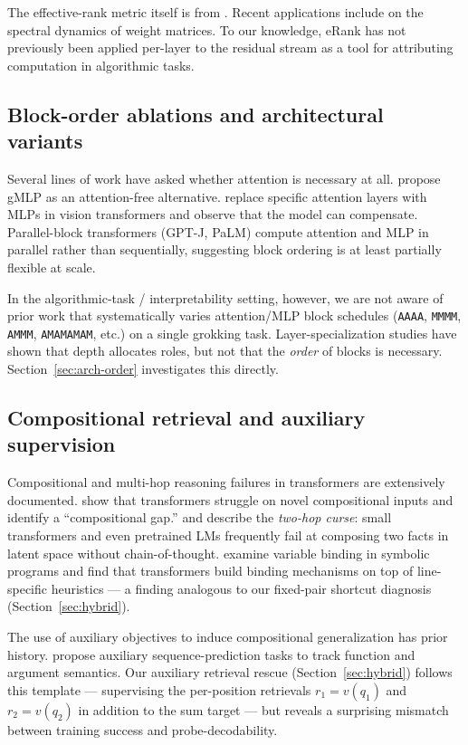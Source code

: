 \documentclass{article}
\begin{document}
The effective-rank metric itself is from \citet{roy2007effective}. Recent applications include \citet{yunis2024spectral} on the spectral dynamics of weight matrices. To our knowledge, eRank has not previously been applied per-layer to the residual stream as a tool for attributing computation in algorithmic tasks.

\subsection{Block-order ablations and architectural variants}

Several lines of work have asked whether attention is necessary at all. \citet{liu2021gmlp} propose gMLP as an attention-free alternative. \citet{lin2024mlp} replace specific attention layers with MLPs in vision transformers and observe that the model can compensate. Parallel-block transformers (GPT-J, PaLM) compute attention and MLP in parallel rather than sequentially, suggesting block ordering is at least partially flexible at scale.

In the algorithmic-task / interpretability setting, however, we are not aware of prior work that systematically varies attention/MLP block schedules (\texttt{AAAA}, \texttt{MMMM}, \texttt{AMMM}, \texttt{AMAMAMAM}, etc.) on a single grokking task. Layer-specialization studies \citep{liu2025layer,geva2021kv} have shown that depth allocates roles, but not that the \emph{order} of blocks is necessary. Section~\ref{sec:arch-order} investigates this directly.

\subsection{Compositional retrieval and auxiliary supervision}

Compositional and multi-hop reasoning failures in transformers are extensively documented. \citet{dziri2023faith} show that transformers struggle on novel compositional inputs and identify a ``compositional gap.'' \citet{wang2025twohop} and \citet{yang2024latent} describe the \emph{two-hop curse}: small transformers and even pretrained LMs frequently fail at composing two facts in latent space without chain-of-thought. \citet{wu2025binding} examine variable binding in symbolic programs and find that transformers build binding mechanisms on top of line-specific heuristics --- a finding analogous to our fixed-pair shortcut diagnosis (Section~\ref{sec:hybrid}).

The use of auxiliary objectives to induce compositional generalization has prior history. \citet{jiang2021auxiliary} propose auxiliary sequence-prediction tasks to track function and argument semantics. Our auxiliary retrieval rescue (Section~\ref{sec:hybrid}) follows this template --- supervising the per-position retrievals $r_1=v(q_1)$ and $r_2=v(q_2)$ in addition to the sum target --- but reveals a surprising mismatch between training success and probe-decodability.
\end{document}
